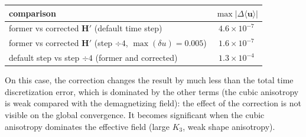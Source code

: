 \documentclass[11pt,a4paper]{article}
\newcommand{\bu}{\mathbf{u}}
\newcommand{\bH}{\mathbf{H}}
\begin{document}
\begin{center}
\begin{tabular}{lc}
\toprule
comparison & $\max|\Delta\langle\bu\rangle|$ \\
\midrule
former vs corrected $\bH'$ (default time step) & $4.6\times10^{-7}$ \\
former vs corrected $\bH'$ (step $\div4$, $\max(\delta u)=0.005$) & $1.6\times10^{-7}$ \\
default step vs step $\div4$ (former and corrected) & $1.3\times10^{-4}$ \\
\bottomrule
\end{tabular}
\end{center}

On this case, the correction changes the result by much less than the total time
discretization error, which is dominated by the other terms (the cubic anisotropy is weak
compared with the demagnetizing field): the effect of the correction is not visible on
the global convergence. It becomes significant when the cubic anisotropy dominates the
effective field (large $K_3$, weak shape anisotropy).
\end{document}
